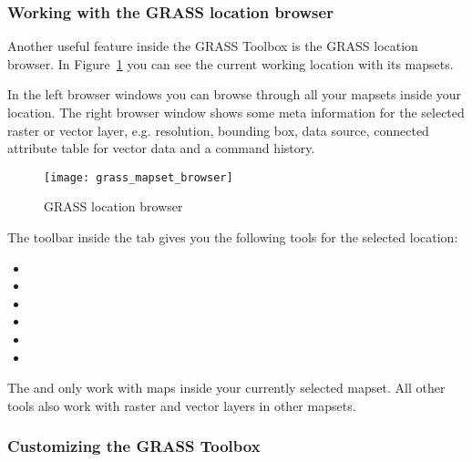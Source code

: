 \subsubsection{Working with the GRASS location browser} 

Another useful feature inside the GRASS Toolbox is the GRASS location browser. In Figure~\ref{fig:grass_mapset_browser} you can see the current working location with its mapsets. 

In the left browser windows you can browse through all your mapsets inside your location. The right browser window shows some meta information for the selected raster or vector layer, e.g. resolution, bounding box, data source, connected attribute table for vector data and a command history.

\begin{figure}[h]
 \begin{center}
 \caption{GRASS location browser \nixcaption}\label{fig:grass_mapset_browser}
 \texttt{[image: grass\_mapset\_browser]}
 \end{center}
\end{figure}


The toolbar inside the  tab gives you the following tools for the selected location:

\begin{itemize}
\item {}
\item {}
\item {}
\item {}
\item {}
\item {}
\end{itemize}

The  and  only work with maps inside your currently selected mapset. All other tools also work with raster and vector layers in other mapsets.

\subsubsection{Customizing the GRASS Toolbox} 
\label{sec:toolbox-customizing}

